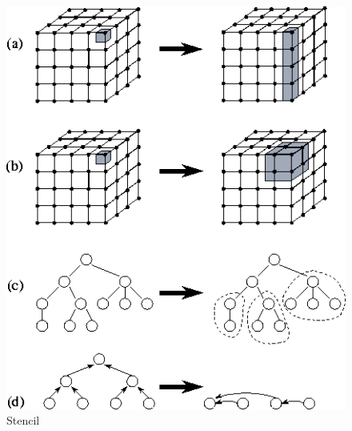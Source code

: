 \documentclass[xcolor={usenames,dvipsnames},12pt,presentation,aspectratio=169]{beamer}
\begin{document}
\begin{frame}
\begin{columns}
\begin{column}{0.4\textwidth}
\begin{center}
\begin{figure}
        \includegraphics[width=\textwidth]{aglomeracao.png}
            \caption{Stencil}
          \end{figure}
        \end{center}
     \end{column}
   \end{columns}
\end{frame}
\end{document}

